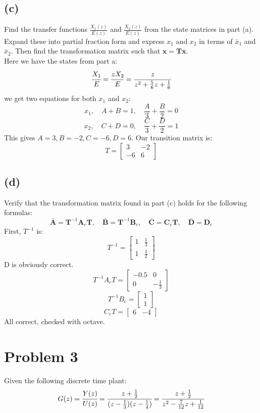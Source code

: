 \documentclass{article}
\begin{document}
\subsection*{(c)}
Find the transfer functions $\frac{X_1(z)}{E(z)}$ and $\frac{X_2(z)}{E(z)}$ from the state matrices in part (a). Expand these into partial fraction form and express $x_1$ and $x_2$ in terms of $\bar{x}_1$ and $\bar{x}_2$. Then find the transformation matrix such that $\boldsymbol{x}=\boldsymbol{T}\bar{\boldsymbol{x}}$.\\
Here we have the states from part a:
\[\cfrac{X_1}{E}=\cfrac{zX_2}{E}=\cfrac{z}{z^2+\frac{5}{6}z+\frac{1}{6}}\]
we get two equations for both $x_1$ and $x_2$:
\[x_1,\quad A+B=1,\quad \frac{A}{3}+\frac{B}{2}=0\]
\[x_2,\quad C+D=0,\quad \frac{C}{3}+\frac{D}{2}=1\]
This gives $A=3,B=-2,C=-6,D=6$. Our transition matrix is:
\[T=\begin{bmatrix}3 &-2\\-6&6\end{bmatrix}\]

\subsection*{(d)}
Verify that the transformation matrix found in part (c) holds for the following formulas:
\[\bar{\boldsymbol{A}}=\boldsymbol{T}^{-1}\boldsymbol{A}_c\boldsymbol{T},\quad \bar{\boldsymbol{B}}=\boldsymbol{T}^{-1}\boldsymbol{B}_c,\quad \bar{\boldsymbol{C}}=\boldsymbol{C}_c\boldsymbol{T},\quad \bar{\boldsymbol{D}}=\boldsymbol{D}_c\]
First, $T^{-1}$ is:
\[T^{-1}=\begin{bmatrix}1&\frac{1}{3}\\1&\frac{1}{2}\end{bmatrix}\]
D is obviously correct.
\[T^{-1}A_cT=\begin{bmatrix}-0.5&0\\0&-\frac{1}{3}\end{bmatrix}\]
\[T^{-1}B_c=\begin{bmatrix}1\\1\end{bmatrix}\]
\[C_cT=\begin{bmatrix}6&-4\end{bmatrix}\]
All correct, checked with octave.


\section*{Problem 3}
Given the following discrete time plant:
\[G(z)=\cfrac{Y(z)}{U(z)}=\cfrac{z+\frac{1}{2}}{(z-\frac{1}{3})(z-\frac{1}{4})}=\cfrac{z+\frac{1}{2}}{z^2-\frac{7}{12}z+\frac{1}{12}}\]
\end{document}
